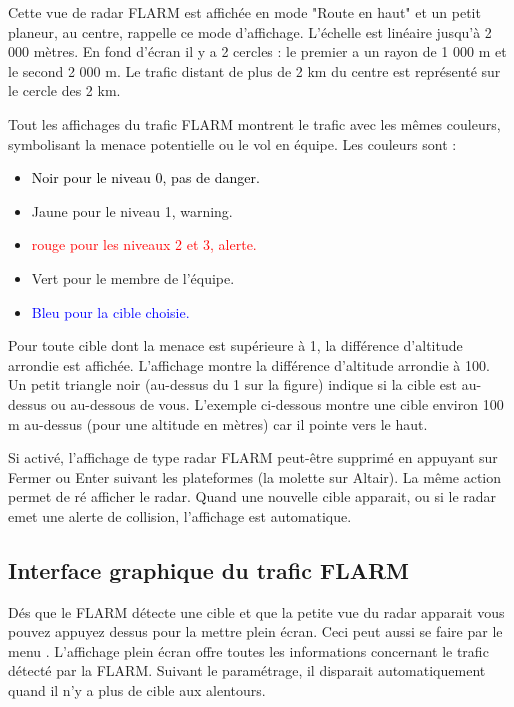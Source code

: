 Cette vue de radar FLARM est affichée en mode "Route en haut" et un petit planeur, au centre, rappelle ce mode d'affichage. L'échelle est linéaire jusqu'à 2 000 mètres. En fond d'écran il y a 2 cercles : le premier a un rayon de 1 000 m et le second 2 000 m. Le trafic distant de plus de 2 km du centre est représenté sur le cercle des 2 km.

Tout les affichages du trafic FLARM montrent le trafic avec les mêmes couleurs, symbolisant la menace potentielle ou le vol en équipe. Les couleurs sont :
\begin{itemize}
\item \textcolor{black} {Noir pour le niveau 0, pas de danger.}
\item \textcolor{warning} { Jaune pour le niveau 1, warning.}
\item \textcolor{red} {rouge pour les niveaux 2 et 3, alerte.}
\item \textcolor{teammate} {Vert pour le membre de l'équipe.}
\item \textcolor{blue} {Bleu pour la cible choisie.}
\end{itemize}

Pour toute cible dont la menace est supérieure à 1, la différence d'altitude arrondie est affichée. L'affichage montre la différence d'altitude arrondie à 100. Un petit triangle noir (au-dessus du 1 sur la figure) indique si la cible est au-dessus ou au-dessous de vous. L'exemple ci-dessous montre une cible environ 100 m au-dessus (pour une altitude en mètres) car il pointe vers le haut.

Si activé, l'affichage de type radar FLARM peut-être supprimé en appuyant sur Fermer ou Enter suivant les plateformes (la molette sur Altair). La même action permet de ré afficher le radar. Quand une nouvelle cible apparait, ou si le radar emet une alerte de collision, l'affichage est automatique.

\subsection*{Interface graphique du trafic FLARM}\label{sec:flarm-traffic}

Dés que le FLARM détecte une cible et que la petite vue du radar apparait vous pouvez appuyez dessus pour la mettre plein écran. Ceci peut aussi se faire par le menu \blink{}.
L'affichage plein écran offre toutes les informations concernant le trafic détecté par la FLARM. Suivant le paramétrage, il disparait automatiquement quand il n'y a plus de cible aux alentours.

